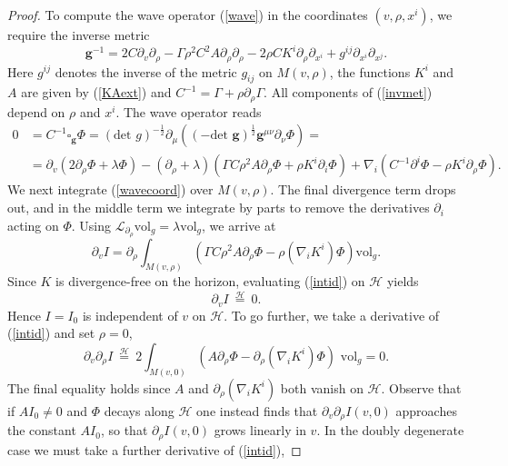 \documentclass[11pt, reqno]{amsart}
\theoremstyle{plain}
\theoremstyle{definition}
\numberwithin{equation}{section}
\begin{document}
\begin{proof}
To compute the wave operator (\ref{wave}) in the coordinates $(v,\rho,x^i)$, we require the inverse metric
\begin{equation} \label{invmet}
    \textbf{g}^{-1} = 2C\partial_v\partial_\rho - \Gamma\rho^2C^{2}A\partial_\rho\partial_\rho -2\rho CK^i\partial_\rho\partial_{x^i} + g^{ij}\partial_{x^i}\partial_{x^j}.
\end{equation}
Here $g^{ij}$ denotes the inverse of the metric $g_{ij}$ on $M(v,\rho)$, the functions $K^i$ and $A$ are given by (\ref{KAext}) and $C^{-1} = \Gamma + \rho\partial_\rho\Gamma$.
All components of (\ref{invmet}) depend on $\rho$ and $x^i$. The wave operator reads
\begin{align}\label{wavecoord}
    0 &= C^{-1}\square_{\textbf{g}}\Phi = (\text{det } g)^{-\frac 12}\partial_\mu((-\text{det }\textbf{g})^{\frac 12}\textbf{g}^{\mu\nu}\partial_\nu\Phi) = \nonumber\\&= \partial_v(2\partial_\rho\Phi + \lambda \Phi) - (\partial_\rho + \lambda)(\Gamma C\rho^2 A\partial_\rho\Phi + \rho K^i\partial_i\Phi) + \nabla_i(C^{-1}\partial^i\Phi - \rho K^i\partial_\rho \Phi).
\end{align}
We next integrate (\ref{wavecoord}) over $M(v,\rho)$. The final divergence term drops out, and in the middle term we integrate by parts to remove the derivatives $\partial_i$ acting on $\Phi$. Using $\mathcal{L}_{\partial_\rho}\text{vol}_g = \lambda\text{vol}_g$, we arrive at
\begin{equation} \label{intid}
    \partial_v I = \partial_\rho \int_{M(v,\rho)}\left(\Gamma C\rho^2A\partial_\rho \Phi -\rho (\nabla_i K^i)\Phi \right)\text{vol}_g.
\end{equation}
Since $K$ is divergence-free on the horizon, evaluating (\ref{intid}) on $\mathcal{H}$ yields
\begin{equation} \label{Ivr0}
    \partial_v I \:\overset{\mathcal{H}}{=}\:0.
\end{equation}
Hence $I = I_0$ is independent of $v$ on $\mathcal{H}$. To go further, we take a derivative of (\ref{intid}) and set $\rho = 0$,
\begin{equation}
    \partial_v \partial_\rho I \:\overset{\mathcal{H}}{=}\: 2\int_{M(v,0)}\left(A\partial_\rho\Phi - \partial_\rho(\nabla_i K^i)\Phi\right)\text{ vol}_g = 0. \label{Ivr1}
\end{equation}
The final equality holds since $A$ and $\partial_\rho(\nabla_i K^i)$ both vanish on $\mathcal{H}$. Observe that if $AI_0 \neq 0$ and $\Phi$ decays along $\mathcal{H}$ one instead finds that $\partial_v\partial_\rho I(v,0)$ approaches the constant $AI_0$, so that $\partial_\rho I(v,0)$ grows linearly in $v$. In the doubly degenerate case we must take a further derivative of (\ref{intid}),

\end{proof}
\end{document}
